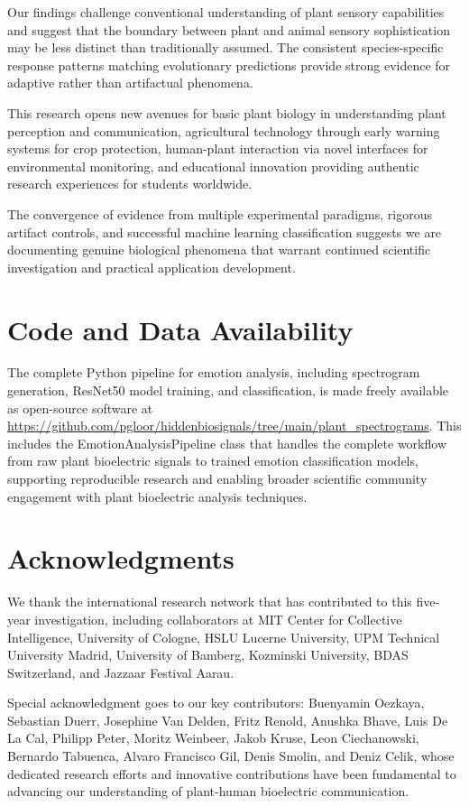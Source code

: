\documentclass{article}
\begin{document}
Our findings challenge conventional understanding of plant sensory capabilities and suggest that the boundary between plant and animal sensory sophistication may be less distinct than traditionally assumed. The consistent species-specific response patterns matching evolutionary predictions provide strong evidence for adaptive rather than artifactual phenomena.

This research opens new avenues for basic plant biology in understanding plant perception and communication, agricultural technology through early warning systems for crop protection, human-plant interaction via novel interfaces for environmental monitoring, and educational innovation providing authentic research experiences for students worldwide.

The convergence of evidence from multiple experimental paradigms, rigorous artifact controls, and successful machine learning classification suggests we are documenting genuine biological phenomena that warrant continued scientific investigation and practical application development.

\section*{Code and Data Availability}

The complete Python pipeline for emotion analysis, including spectrogram generation, ResNet50 model training, and classification, is made freely available as open-source software at \url{https://github.com/pgloor/hiddenbiosignals/tree/main/plant_spectrograms}. This includes the EmotionAnalysisPipeline class that handles the complete workflow from raw plant bioelectric signals to trained emotion classification models, supporting reproducible research and enabling broader scientific community engagement with plant bioelectric analysis techniques.

\section*{Acknowledgments}

We thank the international research network that has contributed to this five-year investigation, including collaborators at MIT Center for Collective Intelligence, University of Cologne, HSLU Lucerne University, UPM Technical University Madrid, University of Bamberg, Kozminski University, BDAS Switzerland, and Jazzaar Festival Aarau. 

Special acknowledgment goes to our key contributors: Buenyamin Oezkaya, Sebastian Duerr, Josephine Van Delden, Fritz Renold, Anushka Bhave, Luis De La Cal, Philipp Peter, Moritz Weinbeer, Jakob Kruse, Leon Ciechanowski, Bernardo Tabuenca, Alvaro Francisco Gil, Denis Smolin, and Deniz Celik, whose dedicated research efforts and innovative contributions have been fundamental to advancing our understanding of plant-human bioelectric communication.
\end{document}
